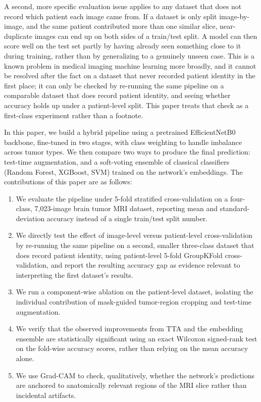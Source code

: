 \documentclass[conference]{IEEEtran}
\begin{document}
A second, more specific evaluation issue applies to any dataset that does not record which patient each image came from. If a dataset is only split image-by-image, and the same patient contributed more than one similar slice, near-duplicate images can end up on both sides of a train/test split. A model can then score well on the test set partly by having already seen something close to it during training, rather than by generalizing to a genuinely unseen case. This is a known problem in medical imaging machine learning more broadly, and it cannot be resolved after the fact on a dataset that never recorded patient identity in the first place; it can only be checked by re-running the same pipeline on a comparable dataset that does record patient identity, and seeing whether accuracy holds up under a patient-level split. This paper treats that check as a first-class experiment rather than a footnote.

In this paper, we build a hybrid pipeline using a pretrained EfficientNetB0 backbone, fine-tuned in two stages, with class weighting to handle imbalance across tumor types. We then compare two ways to produce the final prediction: test-time augmentation, and a soft-voting ensemble of classical classifiers (Random Forest, XGBoost, SVM) trained on the network's embeddings. The contributions of this paper are as follows:

\begin{enumerate}
    \item We evaluate the pipeline under 5-fold stratified cross-validation on a four-class, 7,023-image brain tumor MRI dataset, reporting mean and standard-deviation accuracy instead of a single train/test split number.
    \item We directly test the effect of image-level versus patient-level cross-validation by re-running the same pipeline on a second, smaller three-class dataset that does record patient identity, using patient-level 5-fold GroupKFold cross-validation, and report the resulting accuracy gap as evidence relevant to interpreting the first dataset's results.
    \item We run a component-wise ablation on the patient-level dataset, isolating the individual contribution of mask-guided tumor-region cropping and test-time augmentation.
    \item We verify that the observed improvements from TTA and the embedding ensemble are statistically significant using an exact Wilcoxon signed-rank test on the fold-wise accuracy scores, rather than relying on the mean accuracy alone.
    \item We use Grad-CAM to check, qualitatively, whether the network's predictions are anchored to anatomically relevant regions of the MRI slice rather than incidental artifacts.
\end{enumerate}
\end{document}
